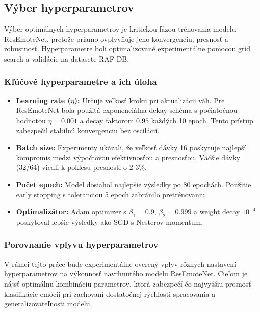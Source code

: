 \subsection{Výber hyperparametrov}

Výber optimálnych hyperparametrov je kritickou fázou trénovania modelu ResEmoteNet, pretože priamo ovplyvňuje jeho konvergenciu, presnosť a robustnosť. Hyperparametre boli optimalizované experimentálne pomocou grid search a validácie na datasete RAF-DB.

\subsubsection{Kľúčové hyperparametre a ich úloha}

\begin{itemize}
    \item \textbf{Learning rate ($\eta$):} 
    Určuje veľkosť kroku pri aktualizácii váh. Pre ResEmoteNet bola použitá exponenciálna dekay schéma s počiatočnou hodnotou $\eta = 0.001$ a decay faktorom $0.95$ každých 10 epoch. Tento prístup zabezpečil stabilnú konvergenciu bez oscilácií.

    \item \textbf{Batch size:} 
    Experimenty ukázali, že veľkosť dávky 16 poskytuje najlepší kompromis medzi výpočtovou efektívnosťou a presnosťou. Väčšie dávky (32/64) viedli k poklesu presnosti o 2-3\%.

    \item \textbf{Počet epoch:} 
    Model dosiahol najlepšie výsledky po 80 epochách. Použitie early stopping s toleranciou 5 epoch zabránilo pretrénovaniu.

    \item \textbf{Optimalizátor:} 
    Adam optimizer s $\beta_1=0.9$, $\beta_2=0.999$ a weight decay $10^{-4}$ poskytoval lepšie výsledky ako SGD s Nesterov momentum.
\end{itemize}

\subsubsection{Porovnanie vplyvu hyperparametrov}
V rámci tejto práce bude experimentálne overený vplyv rôznych nastavení hyperparametrov na výkonnosť navrhnutého modelu ResEmoteNet. Cieľom je nájsť optimálnu kombináciu parametrov, ktorá zabezpečí čo najvyššiu presnosť klasifikácie emócií pri zachovaní dostatočnej rýchlosti spracovania a generalizovateľnosti modelu.

